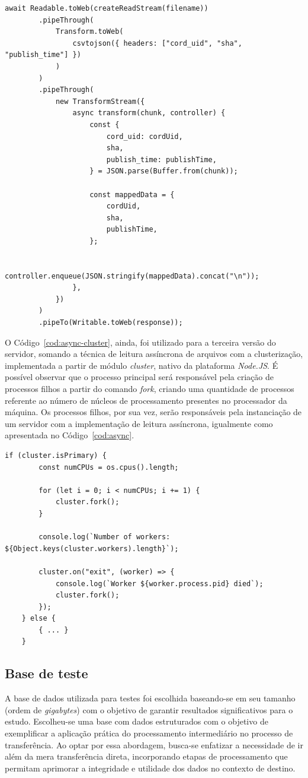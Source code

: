 \documentclass[12pt]{article}
\begin{document}
\begin{lstlisting}[caption={Implementação da leitura do arquivo de forma assíncrona}, label=cod:async]
	await Readable.toWeb(createReadStream(filename))
		.pipeThrough(
			Transform.toWeb(
				csvtojson({ headers: ["cord_uid", "sha", "publish_time"] })
			)
		)
		.pipeThrough(
			new TransformStream({
				async transform(chunk, controller) {
					const {
						cord_uid: cordUid,
						sha,
						publish_time: publishTime,
					} = JSON.parse(Buffer.from(chunk));

					const mappedData = {
						cordUid,
						sha,
						publishTime,
					};

					controller.enqueue(JSON.stringify(mappedData).concat("\n"));
				},
			})
		)
		.pipeTo(Writable.toWeb(response));
\end{lstlisting}

O Código~\ref{cod:async-cluster}, ainda, foi utilizado para a terceira versão do servidor, somando a técnica de leitura
assíncrona de arquivos com a clusterização, implementada a partir de módulo \textit{cluster}, nativo da plataforma
\textit{Node.JS}. É possível observar que o processo principal será responsável pela criação de processos filhos a partir
do comando \textit{fork}, criando uma quantidade de processos referente ao número de núcleos de processamento presentes
no processador da máquina. Os processos filhos, por sua vez, serão responsáveis pela instanciação de um servidor com 
a implementação de leitura assíncrona, igualmente como apresentada no Código~\ref{cod:async}.

\begin{lstlisting}[caption={Implementação da técnica de clusterização}, label=cod:async-cluster]
	if (cluster.isPrimary) {
		const numCPUs = os.cpus().length;

		for (let i = 0; i < numCPUs; i += 1) {
			cluster.fork();
		}

		console.log(`Number of workers: ${Object.keys(cluster.workers).length}`);

		cluster.on("exit", (worker) => {
			console.log(`Worker ${worker.process.pid} died`);
			cluster.fork();
		});
	} else {
		{ ... }
	}
\end{lstlisting}


\subsection{Base de teste}

A base de dados utilizada para testes foi escolhida baseando-se em seu tamanho (ordem de \textit{gigabytes}) com
o objetivo de garantir resultados significativos para o estudo. Escolheu-se uma base com dados estruturados com o 
objetivo de exemplificar a aplicação prática do processamento intermediário no processo de transferência. 
Ao optar por essa abordagem, busca-se enfatizar a necessidade de ir além da mera transferência direta, 
incorporando etapas de processamento que permitam aprimorar a integridade e utilidade dos dados no contexto de destino.
\end{document}
